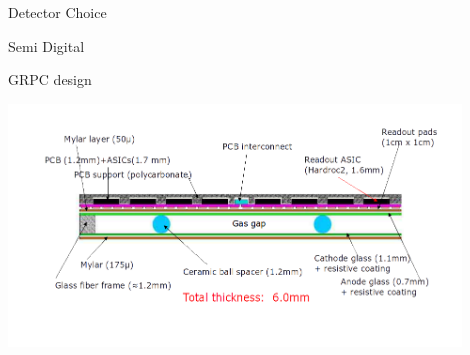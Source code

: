 \documentclass[10pt]{beamer}
\begin{document}
\begin{frame}{Detector Choice}
\begin{block}{  Semi Digital}
  \end{block} 

\end{frame}

\begin{frame}{GRPC design}

  \centerline{\includegraphics[width=0.9\textwidth,height=0.4\textheight]{images/GRPCSchema}}
 
  
  \pause   

 \begin{columns}
      \begin{column}{0.45\textwidth}

        \begin{center}
        \end{center}
      \end{column}
\pause
      \begin{column}{0.45\textwidth}


\end{column}
\end{columns}
\end{frame}
\end{document}
